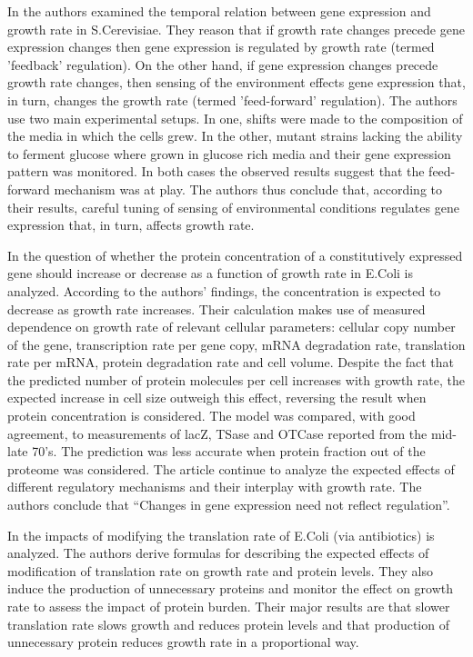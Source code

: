 \documentclass[a4page,notitlepage]{article}
\begin{document}
In \cite{Levy2009} the authors examined the temporal relation between gene expression and growth rate in S.Cerevisiae.
They reason that if growth rate changes precede gene expression changes then gene expression is regulated by growth rate (termed 'feedback' regulation).
On the other hand, if gene expression changes precede growth rate changes, then sensing of the environment effects gene expression that, in turn, changes the growth rate (termed 'feed-forward' regulation).
The authors use two main experimental setups.
In one, shifts were made to the composition of the media in which the cells grew.
In the other, mutant strains lacking the ability to ferment glucose where grown in glucose rich media and their gene expression pattern was monitored.
In both cases the observed results suggest that the feed-forward mechanism was at play.
The authors thus conclude that, according to their results, careful tuning of sensing of environmental conditions regulates gene expression that, in turn, affects growth rate.

In \cite{Klumpp2009a} the question of whether the protein concentration of a constitutively expressed gene should increase or decrease as a function of growth rate in E.Coli is analyzed.
According to the authors' findings, the concentration is expected to decrease as growth rate increases.
Their calculation makes use of measured dependence on growth rate of relevant cellular parameters: cellular copy number of the gene, transcription rate per gene copy, mRNA degradation rate, translation rate per mRNA, protein degradation rate and cell volume.
Despite the fact that the predicted number of protein molecules per cell increases with growth rate, the expected increase in cell size outweigh this effect, reversing the result when protein concentration is considered.
The model was compared, with good agreement, to measurements of lacZ, TSase and OTCase reported from the mid-late 70's.
The prediction was less accurate when protein fraction out of the proteome was considered.
The article continue to analyze the expected effects of different regulatory mechanisms and their interplay with growth rate.
The authors conclude that ``Changes in gene expression need not reflect regulation''.

In \cite{Scott2010b} the impacts of modifying the translation rate of E.Coli (via antibiotics) is analyzed.
The authors derive formulas for describing the expected effects of modification of translation rate on growth rate and protein levels.
They also induce the production of unnecessary proteins and monitor the effect on growth rate to assess the impact of protein burden.
Their major results are that slower translation rate slows growth and reduces protein levels and that production of unnecessary protein reduces growth rate in a proportional way.
\end{document}
